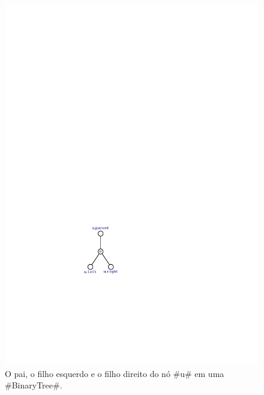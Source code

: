 \begin{figure}
  \begin{center}
    \includegraphics[scale=0.90909]{figs/bintree-traverse-1} 
  \end{center}
  \caption[Pai e filhos esquerdo e direito]{O pai, o filho esquerdo e o filho direito do nó  #u#
    em uma #BinaryTree#.}
\end{figure}



